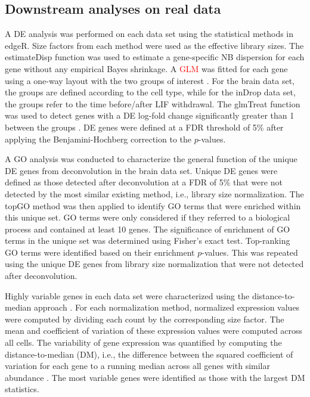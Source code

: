 \documentclass{bmcart}
\newcommand{\revised}[1]{\textcolor{red}{#1}}
\begin{document}
\subsection*{Downstream analyses on real data}
A DE analysis was performed on each data set using the statistical methods in edgeR.
Size factors from each method were used as the effective library sizes.
The estimateDisp function was used to estimate a gene-specific NB dispersion for each gene \cite{chen2014differential} without any empirical Bayes shrinkage.
A \revised{GLM} was fitted for each gene using a one-way layout with the two groups of interest \cite{mccarthy2012differential}.
For the brain data set, the groups are defined according to the cell type, while for the inDrop data set, the groups refer to the time before/after LIF withdrawal.
The glmTreat function was used to detect genes with a DE log-fold change significantly greater than 1 between the groups \cite{mccarthy2009testing}.
DE genes were defined at a FDR threshold of 5\% after applying the Benjamini-Hochberg correction to the $p$-values.


A GO analysis was conducted to characterize the general function of the unique DE genes from deconvolution in the brain data set.
Unique DE genes were defined as those detected after deconvolution at a FDR of 5\% that were not detected by the most similar existing method, i.e., library size normalization.
The topGO method \cite{alexa2010topgo} was then applied to identify GO terms that were enriched within this unique set.
GO terms were only considered if they referred to a biological process and contained at least 10 genes.
The significance of enrichment of GO terms in the unique set was determined using Fisher's exact test.
Top-ranking GO terms were identified based on their enrichment $p$-values.
This was repeated using the unique DE genes from library size normalization that were not detected after deconvolution.

Highly variable genes in each data set were characterized using the distance-to-median approach \cite{kolod2015single}.
For each normalization method, normalized expression values were computed by dividing each count by the corresponding size factor.
The mean and coefficient of variation of these expression values were computed across all cells.
The variability of gene expression was quantified by computing the distance-to-median (DM), i.e., the difference between the squared coefficient of variation for each gene to a running median across all genes with similar abundance \cite{kolod2015single}. 
The most variable genes were identified as those with the largest DM statistics.
\end{document}
